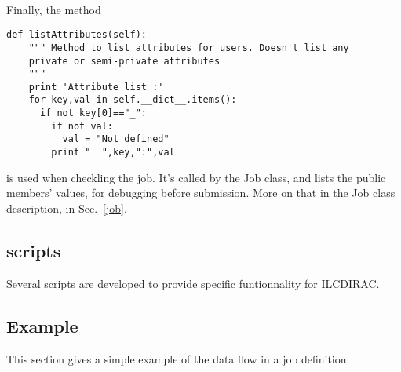 \documentclass[a4paper,12pt]{article}
\begin{document}
~

Finally, the method 
\begin{lstlisting}[firstnumber=274]  
  def listAttributes(self):
    """ Method to list attributes for users. Doesn't list any 
    private or semi-private attributes
    """
    print 'Attribute list :'
    for key,val in self.__dict__.items():
      if not key[0]=="_":
        if not val:
          val = "Not defined"
        print "  ",key,":",val
\end{lstlisting}
is used when checkling the job. It's called by the Job class, and lists the
public members' values, for debugging before submission. More on that in the Job
class description, in Sec.~\ref{job}.



\subsection{scripts}\label{interfacescripts}
Several scripts are developed to provide specific funtionnality for ILCDIRAC.

\subsection{Example}
This section gives a simple example of the data flow in a job definition.
\end{document}
